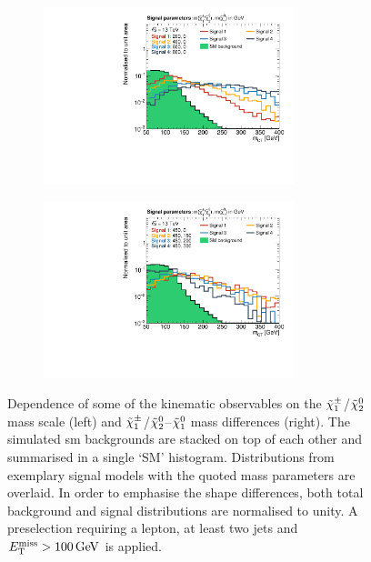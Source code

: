 \begin{figure}
\begin{subfigure}[b]{0.5\linewidth}
	\end{subfigure}\hfill
	\par\medskip
	\begin{subfigure}[b]{0.5\linewidth}
		\centering\includegraphics[width=0.8\textwidth]{high_mass/mct}
	\end{subfigure}\hfill
	\begin{subfigure}[b]{0.5\linewidth}
		\centering\includegraphics[width=0.8\textwidth]{mass_diff/mct}
	\end{subfigure}

	\caption{Dependence of some of the kinematic observables on the \mbox{$\tilde{\chi}_1^\pm$/$\tilde{\chi}_2^0$} mass scale (left) and \mbox{$\tilde{\chi}_1^\pm$/$\tilde{\chi}_2^0$}--$\tilde{\chi}_1^0$ mass differences (right). The simulated \gls{sm} backgrounds are stacked on top of each other and summarised in a single `SM' histogram. Distributions from exemplary signal models with the quoted mass parameters are overlaid. In order to emphasise the shape differences, both total background and signal distributions are normalised to unity. A preselection requiring a lepton, at least two jets and $\etmiss > \SI{100}{\GeV}$ is applied.}\label{fig:norm_obs_app}
\end{figure}

